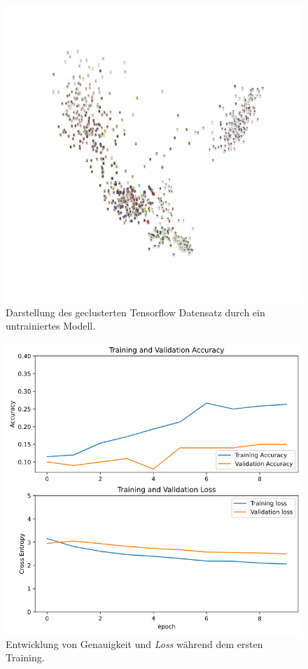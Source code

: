 \documentclass[a4paper,12pt,ngerman]{article}
\begin{document}
\newpage
\begin{figure}[ht]
\includegraphics[width=\linewidth]{image_cluster_untrained}
\centering
\caption{Darstellung des geclusterten Tensorflow Datensatz durch ein untrainiertes Modell.}
\end{figure}

\newpage
\begin{figure}[ht]
\includegraphics[width=\linewidth]{first_training}
\centering
\caption{Entwicklung von Genauigkeit und \textit{Loss} während dem ersten Training.}
\end{figure}
\end{document}
